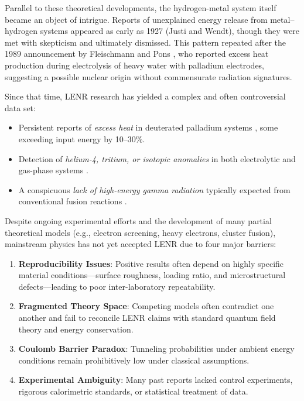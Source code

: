     Parallel to these theoretical developments, the hydrogen-metal system itself became an object of intrigue. Reports of unexplained energy release from metal–hydrogen systems appeared as early as 1927 (Justi and Wendt), though they were met with skepticism and ultimately dismissed. This pattern repeated after the 1989 announcement by Fleischmann and Pons \cite{fleischmann1989}, who reported excess heat production during electrolysis of heavy water with palladium electrodes, suggesting a possible nuclear origin without commensurate radiation signatures.
    
    Since that time, LENR research has yielded a complex and often controversial data set:
    
    \begin{itemize}
        \item Persistent reports of \textit{excess heat} in deuterated palladium systems \cite{oriani1990, mckubre1994}, some exceeding input energy by 10–30\%.
        \item Detection of \textit{helium-4, tritium, or isotopic anomalies} in both electrolytic and gas-phase systems \cite{bockris1991, arata2002, mizuno2007, miley1996}.
        \item A conspicuous \textit{lack of high-energy gamma radiation} typically expected from conventional fusion reactions \cite{storms2010}.
    \end{itemize}
    
    Despite ongoing experimental efforts and the development of many partial theoretical models (e.g., electron screening, heavy electrons, cluster fusion), mainstream physics has not yet accepted LENR due to four major barriers:
    
    \begin{enumerate}
        \item \textbf{Reproducibility Issues}: Positive results often depend on highly specific material conditions—surface roughness, loading ratio, and microstructural defects—leading to poor inter-laboratory repeatability.
        \item \textbf{Fragmented Theory Space}: Competing models often contradict one another and fail to reconcile LENR claims with standard quantum field theory and energy conservation.
        \item \textbf{Coulomb Barrier Paradox}: Tunneling probabilities under ambient energy conditions remain prohibitively low under classical assumptions.
        \item \textbf{Experimental Ambiguity}: Many past reports lacked control experiments, rigorous calorimetric standards, or statistical treatment of data.
    \end{enumerate}
    
